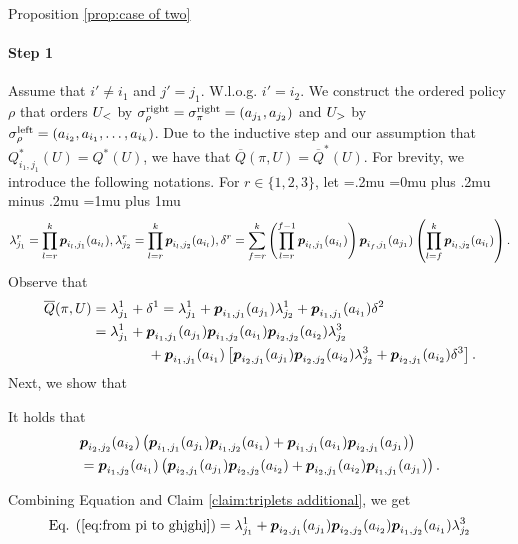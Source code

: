 \begin{proofof}{Proposition \ref{prop:case of two}}
\paragraph{Step 1} Assume that $i'\neq i_1$ and $j' = j_1$. W.l.o.g. $i'=i_2$. We construct the ordered policy $\rho$ that orders $U_<$ by $\sigma^{\textnormal{right}}_\rho=\sigma^{\textnormal{right}}_\pi=(a_{j_1},a_{j_2})$ and $U_>$ by $\sigma^{\textnormal{left}}_\rho=(a_{i_2},a_{i_1},\dots, a_{i_k})$. Due to the inductive step and our assumption that  $Q^*_{i_1,j_1}(U)=Q^*(U)$, we have that $\overline Q(\pi,U)=\overline Q^*(U)$. For brevity, we introduce the following notations. For $r\in \{1,2,3\}$, let
{\thinmuskip=.2mu
\medmuskip=0mu plus .2mu minus .2mu
\thickmuskip=1mu plus 1mu
\[
\lambda^r_{j_1}=\prod_{l=r}^{k} \boldsymbol{ p }_{{i_l},{j_1}}(a_{i_l}),\lambda^r_{j_2}=\prod_{l=r}^{k} \boldsymbol{ p }_{{i_l},{j_2}}(a_{i_l}), \delta^r= \sum_{f=r}^{k} \left(\prod_{l=r}^{f-1} \boldsymbol{ p }_{{i_l},{j_1}}(a_{i_l})\right) \boldsymbol{ p }_{{i_f},{j_1}}(a_{j_1}) \left(\prod_{l=f}^{k} \boldsymbol{ p }_{{i_l},{j_2}}(a_{i_l})\right).
\]
}%
Observe that
\begin{align}\label{eq:from pi to ghjghj}
\overline Q(\pi,U)&=\lambda^1_{j_1}+\delta^1=\lambda^1_{j_1}+\boldsymbol{ p }_{i_1,j_1}(a_{j_1})\lambda^1_{j_2}+\boldsymbol{ p }_{i_1,j_1}(a_{i_1})\delta^2\nonumber\\
&=\lambda^1_{j_1}+\boldsymbol{ p }_{i_1,j_1}(a_{j_1})\boldsymbol{ p }_{i_1,j_2}(a_{i_1})\boldsymbol{ p }_{i_2,j_2}(a_{i_2})\lambda^3_{j_2}\nonumber\\
&\qquad \qquad+\boldsymbol{ p }_{i_1,j_1}(a_{i_1})\left[
\boldsymbol{ p }_{i_2,j_1}(a_{j_1})\boldsymbol{ p }_{i_2,j_2}(a_{i_2})\lambda^3_{j_2}+\boldsymbol{ p }_{i_2,j_1}(a_{i_2})\delta^3\right].
\end{align}
Next, we show that 
\begin{claim}\label{claim:triplets additional}
It holds that
\begin{align*}
&\boldsymbol{ p }_{{i_2},{j_2}}(a_{i_2})\left( \boldsymbol{ p }_{{i_1},{j_1}}(a_{j_1})\boldsymbol{ p }_{{i_1},{j_2}}(a_{i_1})+\boldsymbol{ p }_{{i_1},{j_1}}(a_{i_1})\boldsymbol{ p }_{{i_2},{j_1}}(a_{j_1})\right)\\
&=\boldsymbol{ p }_{{i_1},{j_2}}(a_{i_1})\left(\boldsymbol{ p }_{{i_2},{j_1}}(a_{j_1})\boldsymbol{ p }_{{i_2},{j_2}}(a_{i_2})+\boldsymbol{ p }_{{i_2},{j_1}}(a_{i_2})\boldsymbol{ p }_{{i_1},{j_1}}(a_{j_1})  \right).
\end{align*}
\end{claim}
Combining Equation  and Claim \ref{claim:triplets additional}, we get
\begin{align}\label{eq: flipping}
\textnormal{Eq. } \refeq{eq:from pi to ghjghj}
&=\lambda^1_{j_1}+\bl p_{i_2,j_1}(a_{j_1})\bl p_{i_2,j_2}(a_{i_2})\bl p_{i_1,j_2}(a_{i_1})\lambda^3_{j_2}\nonumber\\

\end{align}
\end{proofof}
